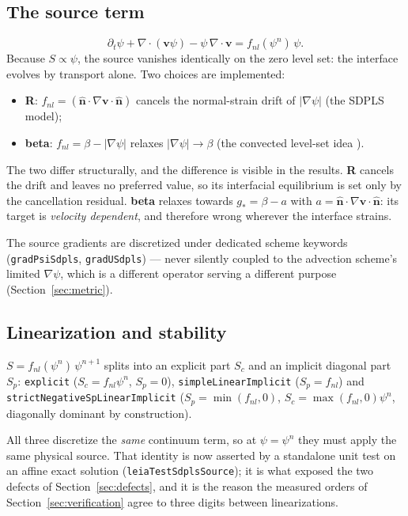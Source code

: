 \documentclass[preprint,3p,11pt]{elsarticle}
\newcommand{\psilev}{\psi}
\newcommand{\nhat}{\hat{\mathbf{n}}}
\newcommand{\gradpsi}{\lvert\nabla\psilev\rvert}
\begin{document}
\subsection{The source term}
\begin{equation}
  \partial_t \psilev + \nabla\cdot(\mathbf{v}\psilev)
  - \psilev\,\nabla\cdot\mathbf{v} = f_{nl}(\psilev^n)\,\psilev .
  \label{eq:sdpls}
\end{equation}
Because $S \propto \psilev$, the source vanishes identically on the zero
level set: the interface evolves by transport alone. Two choices are
implemented:
\begin{itemize}
  \item \textbf{R}: $f_{nl} = (\nhat\cdot\nabla\mathbf{v}\cdot\nhat)$
    cancels the normal-strain drift of $\gradpsi$ (the SDPLS model);
  \item \textbf{beta}: $f_{nl} = \beta - \gradpsi$ relaxes
    $\gradpsi \to \beta$ (the convected level-set idea \cite{ville2011}).
\end{itemize}
The two differ structurally, and the difference is visible in the results.
\textbf{R} cancels the drift and leaves no preferred value, so its interfacial
equilibrium is set only by the cancellation residual. \textbf{beta} relaxes
towards $g_\ast = \beta - a$ with $a = \nhat\cdot\nabla\mathbf{v}\cdot\nhat$:
its target is \emph{velocity dependent}, and therefore wrong wherever the
interface strains.

The source gradients are discretized under dedicated scheme keywords
(\texttt{gradPsiSdpls}, \texttt{gradUSdpls}) --- never silently coupled to
the advection scheme's limited $\nabla\psilev$, which is a different operator
serving a different purpose (Section~\ref{sec:metric}).

\subsection{Linearization and stability}
$S = f_{nl}(\psilev^n)\,\psilev^{n+1}$ splits into an explicit part
$S_c$ and an implicit diagonal part $S_p$: \texttt{explicit}
($S_c = f_{nl}\psilev^n$, $S_p = 0$), \texttt{simpleLinearImplicit}
($S_p = f_{nl}$) and \texttt{strictNegativeSpLinearImplicit}
($S_p = \min(f_{nl},0)$, $S_c = \max(f_{nl},0)\psilev^n$, diagonally dominant
by construction).

All three discretize the \emph{same} continuum term, so at $\psilev=\psilev^n$
they must apply the same physical source. That identity is now asserted by a
standalone unit test on an affine exact solution
(\texttt{leiaTestSdplsSource}); it is what exposed the two defects of
Section~\ref{sec:defects}, and it is the reason the measured orders of
Section~\ref{sec:verification} agree to three digits between linearizations.
\end{document}
